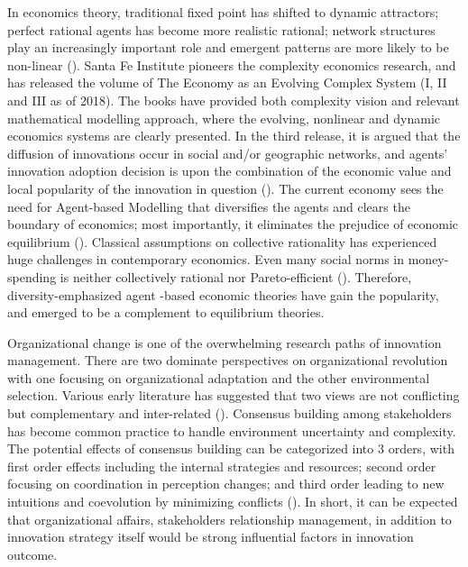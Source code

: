 \documentclass[utf8,english]{gradu3}
\begin{document}
In economics theory, traditional fixed point has shifted to dynamic attractors; perfect rational agents has become more realistic rational; network structures play an increasingly important role and emergent patterns are more likely to be non-linear (\cite{beinhocker2006origin}). Santa Fe Institute pioneers the complexity economics research, and has released the volume of The Economy as an Evolving Complex System (I, II and III as of 2018). The books have provided both complexity vision and relevant mathematical modelling approach, where the evolving, nonlinear and dynamic economics systems are clearly presented. In the third release, it is argued that the diffusion of innovations occur in social and/or geographic networks, and agents' innovation adoption decision is upon the combination of the economic value and local popularity of the innovation in question (\cite{young2006diffusion}). The current economy sees the need for Agent-based Modelling that diversifies the agents and clears the boundary of economics; most importantly, it eliminates the prejudice of economic equilibrium (\cite{farmer2009economy}). Classical assumptions on collective rationality has experienced huge challenges in contemporary economics. Even many social norms  in money-spending is neither collectively rational nor Pareto-efficient (\cite{elster1989social}). Therefore, diversity-emphasized agent -based economic theories have gain the popularity, and emerged to be a complement to equilibrium theories. 

Organizational change is one of the overwhelming research paths of innovation management. There are two dominate perspectives on organizational revolution with one focusing on organizational adaptation and the other environmental selection. Various early literature has suggested that two views are not conflicting but complementary and inter-related (\cite{levinthal1991organizational}). Consensus building among stakeholders has become common practice to handle environment uncertainty and complexity. The potential effects of consensus building can be categorized into 3 orders, with first order effects including the internal strategies and resources; second order focusing on coordination in perception changes; and third order leading to new intuitions and coevolution by minimizing conflicts (\cite{innes1999consensus}). In short, it can be expected that organizational affairs, stakeholders relationship management, in addition to innovation strategy itself would be strong influential factors in innovation outcome.
\end{document}
